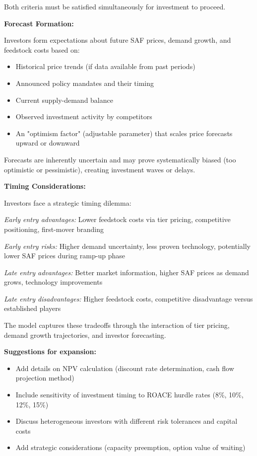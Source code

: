\documentclass[10.5pt]{article}
\begin{document}
Both criteria must be satisfied simultaneously for investment to proceed.

\textbf{Forecast Formation:}

Investors form expectations about future SAF prices, demand growth, and feedstock costs based on:

\begin{itemize}
    \item Historical price trends (if data available from past periods)
    \item Announced policy mandates and their timing
    \item Current supply-demand balance
    \item Observed investment activity by competitors
    \item An "optimism factor" (adjustable parameter) that scales price forecasts upward or downward
\end{itemize}

Forecasts are inherently uncertain and may prove systematically biased (too optimistic or pessimistic), creating investment waves or delays.

\textbf{Timing Considerations:}

Investors face a strategic timing dilemma:

\textit{Early entry advantages:} Lower feedstock costs via tier pricing, competitive positioning, first-mover branding

\textit{Early entry risks:} Higher demand uncertainty, less proven technology, potentially lower SAF prices during ramp-up phase

\textit{Late entry advantages:} Better market information, higher SAF prices as demand grows, technology improvements

\textit{Late entry disadvantages:} Higher feedstock costs, competitive disadvantage versus established players

The model captures these tradeoffs through the interaction of tier pricing, demand growth trajectories, and investor forecasting.

\textbf{Suggestions for expansion:}
\begin{itemize}
    \item Add details on NPV calculation (discount rate determination, cash flow projection method)
    \item Include sensitivity of investment timing to ROACE hurdle rates (8\%, 10\%, 12\%, 15\%)
    \item Discuss heterogeneous investors with different risk tolerances and capital costs
    \item Add strategic considerations (capacity preemption, option value of waiting)
\end{itemize}
\end{document}
